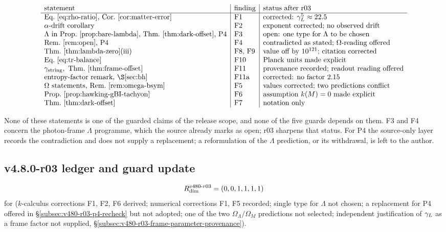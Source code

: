\[
\begin{array}{l|l|l}
\text{statement} & \text{finding} & \text{status after r03}\\
\hline
\text{Eq.~\eqref{eq:rho-ratio}, Cor.~\ref{cor:matter-error}} & \text{F1} & \text{corrected: } \gL^5\approx22.5\\
\alpha\text{-drift corollary} & \text{F2} & \text{exponent corrected; no observed drift}\\
\Lambda\text{ in Prop.~\ref{prop:bare-lambda}, Thm.~\ref{thm:dark-offset}, P4} & \text{F3} & \text{open: one type for }\Lambda\text{ to be chosen}\\
\text{Rem.~\ref{rem:open}, P4} & \text{F4} & \text{contradicted as stated; }\Omega\text{-reading offered}\\
\text{Thm.~\ref{thm:lambda-zero}(iii)} & \text{F8, F9} & \text{value off by }10^{121}\text{; citation corrected}\\
\text{Eq.~\eqref{eq:tr-balance}} & \text{F10} & \text{Planck units made explicit}\\
\gstring,\ \text{Thm.~\ref{thm:frame-offset}} & \text{F11} & \text{provenance recorded; readout reading offered}\\
\text{entropy-factor remark, \S\ref{sec:bh}} & \text{F11a} & \text{corrected: no factor }2.15\\
\Omega\text{ statements, Rem.~\ref{rem:omega-bsym}} & \text{F5} & \text{values corrected; two predictions conflict}\\
\text{Prop.~\ref{prop:hawking-gBI-tachyon}} & \text{F6} & \text{assumption } k(M)=0 \text{ made explicit}\\
\text{Thm.~\ref{thm:dark-offset}} & \text{F7} & \text{notation only}
\end{array}
\]

None of these statements is one of the guarded claims of the release scope, and none of the
five guards depends on them.  F3 and F4 concern the photon-frame \(\Lambda\) programme, which the
source already marks as open; r03 sharpens that status.  For P4 the source-only layer records
the contradiction and does not supply a replacement; a reformulation of the
\(\Lambda\) prediction, or its withdrawal, is left to the author.

\subsection*{v4.8.0-r03 ledger and guard update}
\label{subsec:v480-r03-ledger-guard}

\[
R_{\rm dim}^{v480\text{-}r03}=(0,0,1,1,1,1)
\]
for (\(k\)-calculus corrections F1, F2, F6 derived; numerical corrections F1, F5 recorded; single
type for \(\Lambda\) not chosen; a replacement for P4 offered in \S\ref{subsec:v480-r03-p4-recheck} but not adopted; one of the two
\(\Omega_\Lambda/\Omega_M\) predictions not selected; independent justification of \(\gamma_L\) as a frame factor not supplied, \S\ref{subsec:v480-r03-frame-parameter-provenance}).

